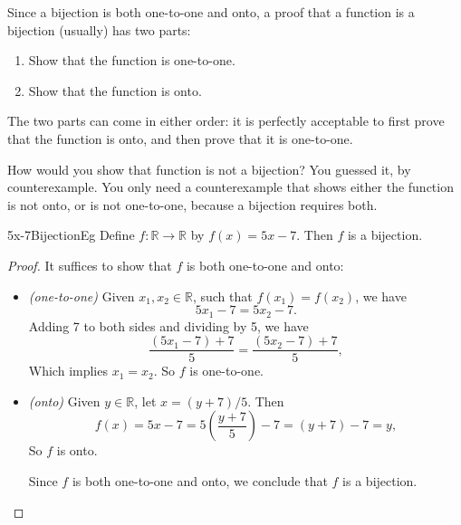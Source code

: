 Since a bijection  is both one-to-one and onto, a proof that a function is a bijection (usually) has two parts:
	\begin{enumerate}
	\item Show that the function is one-to-one.
	\item Show that the function is onto.
	\end{enumerate}
The two parts can come in either order: it is perfectly acceptable to first prove that the function is onto, and then prove that it is one-to-one.

How would you show that function is not a bijection?  You guessed it, by counterexample.  You only need a counterexample that shows either the function is not onto, or is not one-to-one, because a bijection requires both.

\begin{example}{5x-7BijectionEg}
Define $f \colon \mathbb{R} \to \mathbb{R}$ by $f(x) = 5x-7$. Then $f$ is a bijection.

\begin{proof}
It suffices to show that $f$ is both one-to-one and onto:
\begin{itemize}
\item  \emph{(one-to-one)} Given $x_1,x_2 \in \mathbb{R}$, such that $f(x_1) = f(x_2)$, we have
$$5x_1 - 7 = 5x_2 - 7.$$
\medskip
\noindent
Adding 7 to both sides and dividing by 5, we have
$$ \frac{(5x_1-7)+7}{5} =  \frac{(5x_2-7)+7}{5},$$
\noindent
Which implies $x_1=x_2$. So $f$ is one-to-one.
\item
\emph{(onto)}  Given $y \in \mathbb{R}$, let $x = (y+7)/5$. Then
$$ f(x) = 5x-7 = 5 \left( \frac{y+7}{5} \right) - 7 = (y+7) - 7 = y,$$
So $f$ is onto.

Since $f$ is both one-to-one and onto, we conclude that $f$ is a bijection.
\end{itemize}
\end{proof}
\end{example} 

